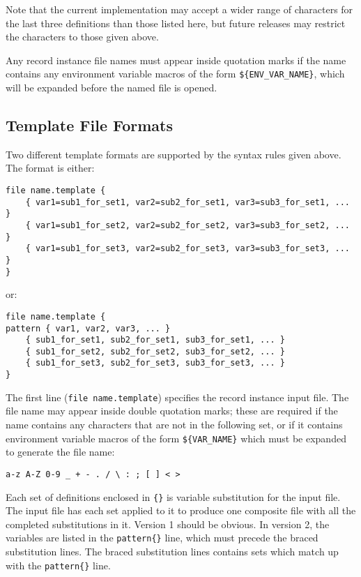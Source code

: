 Note that the current implementation may accept a wider range of characters for the last three definitions than those listed here, but future releases may restrict the characters to those given above.

Any record instance file names must appear inside quotation marks if the name contains any environment variable macros of the form \verb|${ENV_VAR_NAME}|, which will be expanded before the named file is opened.

\subsection{Template File Formats}

Two different template formats are supported by the syntax rules given above.
The format is either:

\begin{verbatim}
file name.template {
    { var1=sub1_for_set1, var2=sub2_for_set1, var3=sub3_for_set1, ... }
    { var1=sub1_for_set2, var2=sub2_for_set2, var3=sub3_for_set2, ... }
    { var1=sub1_for_set3, var2=sub2_for_set3, var3=sub3_for_set3, ... }
}
\end{verbatim}

or:

\begin{verbatim}
file name.template {
pattern { var1, var2, var3, ... }
    { sub1_for_set1, sub2_for_set1, sub3_for_set1, ... }
    { sub1_for_set2, sub2_for_set2, sub3_for_set2, ... }
    { sub1_for_set3, sub2_for_set3, sub3_for_set3, ... }
}
\end{verbatim}

The first line (\verb|file name.template|) specifies the record instance input file. The file name may appear inside double
quotation marks; these are required if the name contains any characters that are not in the following set, or if it contains
environment variable macros of the form \verb|${VAR_NAME}| which must be expanded to generate the file name:

\begin{verbatim}
a-z A-Z 0-9 _ + - . / \ : ; [ ] < >
\end{verbatim}

Each set of definitions enclosed in \verb|{}| is variable substitution for the input file. The input file has each set applied to it to
produce one composite file with all the completed substitutions in it. Version 1 should be obvious. In version 2, the
variables are listed in the \verb|pattern{}| line, which must precede the braced substitution lines. The braced substitution
lines contains sets which match up with the \verb|pattern{}| line.

